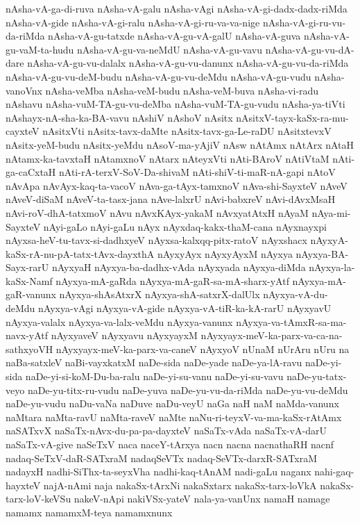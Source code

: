 {nAsha-vA-ga-di-ruva
nAsha-vA-galu
nAsha-vAgi
nAsha-vA-gi-dadx-dadx-riMda
nAsha-vA-gide
nAsha-vA-gi-ralu
nAsha-vA-gi-ru-va-va-nige
nAsha-vA-gi-ru-vu-da-riMda
nAsha-vA-gu-tatxde
nAsha-vA-gu-vA-galU
nAsha-vA-guva
nAsha-vA-gu-vaM-ta-hudu
nAsha-vA-gu-va-neMdU
nAsha-vA-gu-vavu
nAsha-vA-gu-vu-dA-dare
nAsha-vA-gu-vu-dalalx
nAsha-vA-gu-vu-danunx
nAsha-vA-gu-vu-da-riMda
nAsha-vA-gu-vu-deM-budu
nAsha-vA-gu-vu-deMdu
nAsha-vA-gu-vudu
nAsha-vanoVnx
nAsha-veMba
nAsha-veM-budu
nAsha-veM-buva
nAsha-vi-radu
nAshavu
nAsha-vuM-TA-gu-vu-deMba
nAsha-vuM-TA-gu-vudu
nAsha-ya-tiVti
nAshayx-nA-sha-ka-BA-vavu
nAshiV
nAshoV
nAsitx
nAsitxV-tayx-kaSx-ra-mu-cayxteV
nAsitxVti
nAsitx-tavx-daMte
nAsitx-tavx-ga-Le-raDU
nAsitxtevxV
nAsitx-yeM-budu
nAsitx-yeMdu
nAsoV-ma-yAjiV
nAsw
nAtAmx
nAtArx
nAtaH
nAtamx-ka-tavxtaH
nAtamxnoV
nAtarx
nAteyxVti
nAti-BAroV
nAtiVtaM
nAti-ga-caCxtaH
nAti-rA-terxV-SoV-Da-shivaM
nAti-shiV-ti-maR-nA-gapi
nAtoV
nAvApa
nAvAyx-kaq-ta-vacoV
nAva-ga-tAyx-tamxnoV
nAva-shi-SayxteV
nAveV
nAveV-diSaM
nAveV-ta-tasx-jana
nAve-lalxrU
nAvi-babxreV
nAvi-dAvxMsaH
nAvi-roV-dhA-tatxmoV
nAvu
nAvxKAyx-yakaM
nAvxyatAtxH
nAyaM
nAya-mi-SayxteV
nAyi-gaLo
nAyi-gaLu
nAyx
nAyxdaq-kakx-thaM-cana
nAyxnayxpi
nAyxsa-heV-tu-tavx-si-dadhxyeV
nAyxsa-kalxqq-pitx-ratoV
nAyxshacx
nAyxyA-kaSx-rA-nu-pA-tatx-tAvx-dayxthA
nAyxyAyx
nAyxyAyxM
nAyxya
nAyxya-BA-Sayx-rarU
nAyxyaH
nAyxya-ba-dadhx-vAda
nAyxyada
nAyxya-diMda
nAyxya-la-kaSx-Namf
nAyxya-mA-gaRda
nAyxya-mA-gaR-sa-mA-sharx-yAtf
nAyxya-mA-gaR-vanunx
nAyxya-shAsAtxrX
nAyxya-shA-satxrX-dalUlx
nAyxya-vA-du-deMdu
nAyxya-vAgi
nAyxya-vA-gide
nAyxya-vA-tiR-ka-kA-rarU
nAyxyavU
nAyxya-valalx
nAyxya-va-lalx-veMdu
nAyxya-vanunx
nAyxya-va-tAmxR-sa-ma-navx-yAtf
nAyxyaveV
nAyxyavu
nAyxyayxM
nAyxyayx-meV-ka-parx-va-ca-na-sathxyoVH
nAyxyayx-meV-ka-parx-va-caneV
nAyxyoV
nUnaM
nUrAru
nUru
na
naBa-satxleV
naBi-vayxkatxM
naDe-sida
naDe-yade
naDe-ya-lA-ravu
naDe-yi-sida
naDe-yi-si-koM-Du-ba-ralu
naDe-yi-su-vanu
naDe-yi-su-vavu
naDe-yu-tatx-veyo
naDe-yu-titx-ru-vudu
naDe-yuva
naDe-yu-vu-da-riMda
naDe-yu-vu-deMdu
naDe-yu-vudu
naDu-vaNa
naDuve
naDu-veyU
naGa
naH
naM
naMda-vanunx
naMtara
naMta-ravU
naMta-raveV
naMte
naNu-ri-teyxV-va-ma-kaSx-rAtAmx
naSATxvX
naSaTx-nAvx-du-pa-pa-dayxteV
naSaTx-vAda
naSaTx-vA-darU
naSaTx-vA-give
naSeTxV
naca
naceY-tArxya
nacn
nacna
nacnathaRH
nacnf
nadaq-SeTxV-daR-SATxraM
nadaqSeVTx
nadaq-SeVTx-darxR-SATxraM
nadayxH
nadhi-SiThx-ta-seyxVha
nadhi-kaq-tAnAM
nadi-gaLu
naganx
nahi-gaq-hayxteV
najA-nAmi
naja
nakaSx-tArxNi
nakaSxtarx
nakaSx-tarx-loVkA
nakaSx-tarx-loV-keVSu
nakeV-nApi
nakiVSx-yateV
nala-ya-vanUnx
namaH
namage
namamx
namamxM-teya
namamxnunx
}
